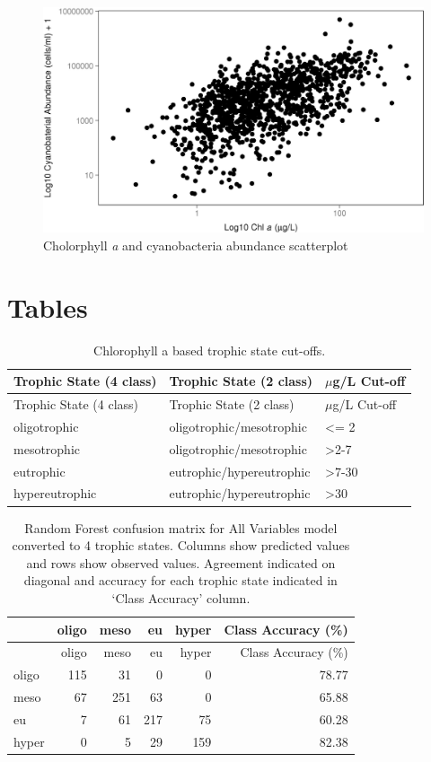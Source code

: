 \documentclass[12pt,]{article}
\begin{document}
\newpage

\newpage

\newpage

\begin{figure}[htbp]
\centering
\includegraphics{manuscript_files/figure-latex/chla_cyano_scatterplot-1.jpeg}
\caption{Cholorphyll \emph{a} and cyanobacteria abundance
scatterplot\label{fig:scatterplot}}
\end{figure}

\newpage

\section{Tables}\label{tables}

\begin{longtable}[c]{@{}lll@{}}
\caption{Chlorophyll a based trophic state cut-offs.
\label{tab:trophicStateTable}}\tabularnewline
\toprule
Trophic State (4 class) & Trophic State (2 class) & \(\mu\)g/L
Cut-off\tabularnewline
\midrule
\endfirsthead
\toprule
Trophic State (4 class) & Trophic State (2 class) & \(\mu\)g/L
Cut-off\tabularnewline
\midrule
\endhead
oligotrophic & oligotrophic/mesotrophic & \textless{}= 2\tabularnewline
mesotrophic & oligotrophic/mesotrophic &
\textgreater{}2-7\tabularnewline
eutrophic & eutrophic/hypereutrophic & \textgreater{}7-30\tabularnewline
hypereutrophic & eutrophic/hypereutrophic &
\textgreater{}30\tabularnewline
\bottomrule
\end{longtable}

\newpage

\begin{longtable}[c]{@{}lrrrrr@{}}
\caption{Random Forest confusion matrix for All Variables model
converted to 4 trophic states. Columns show predicted values and rows
show observed values. Agreement indicated on diagonal and accuracy for
each trophic state indicated in `Class Accuracy' column.
\label{tab:Confusion_All_4}}\tabularnewline
\toprule
& oligo & meso & eu & hyper & Class Accuracy (\%)\tabularnewline
\midrule
\endfirsthead
\toprule
& oligo & meso & eu & hyper & Class Accuracy (\%)\tabularnewline
\midrule
\endhead
oligo & 115 & 31 & 0 & 0 & 78.77\tabularnewline
meso & 67 & 251 & 63 & 0 & 65.88\tabularnewline
eu & 7 & 61 & 217 & 75 & 60.28\tabularnewline
hyper & 0 & 5 & 29 & 159 & 82.38\tabularnewline
\bottomrule
\end{longtable}
\end{document}
